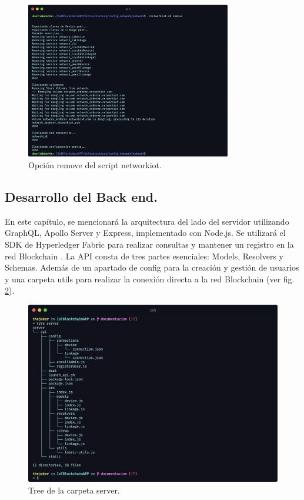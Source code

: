 \begin{figure}[ht!]
  \centering
  \includegraphics[width=0.8\textwidth]{imagenes/desarrollo/comandos/remove}
  \caption{Opción remove del script networkiot.}
  \label{fig:remove}
\end{figure}

\subsection{Desarrollo del Back end.}

En este capítulo, se mencionará la arquitectura del lado del servidor utilizando GraphQL, Apollo Server y Express, 
implementado con Node.js. Se utilizará el SDK de Hyperledger Fabric para realizar consultas y mantener un registro 
en la red Blockchain \cite{documentation-home-apollo-basics, express-docs, hyperledger-fabric-node-sdk}. La API 
consta de tres partes esenciales: Models, Resolvers y Schemas. Además de un apartado de config para la creación y 
gestión de usuarios y una carpeta utils para realizar la conexión directa a la red Blockchain \cite{structure-graphql-node.js} 
(ver fig. \ref{fig:tree-server}).

\begin{figure}[ht!]
  \centering
  \includegraphics[width=\textwidth]{imagenes/desarrollo/tree_server}
  \caption{Tree de la carpeta server.}
  \label{fig:tree-server}
\end{figure}

